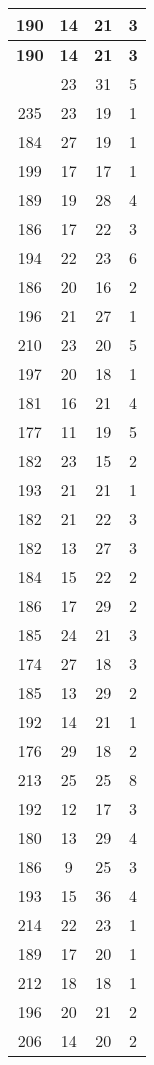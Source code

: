 \documentclass{article}
\begin{document}
\begin{center}
\begin{longtable}{|c|c|c|c|}
\hline
\textbf{190} & \textbf{14} & \textbf{21} & \textbf{3} \\
\hline
\endfirsthead

\hline
\textbf{190} & \textbf{14} & \textbf{21} & \textbf{3} \\
\hline
\endhead

\hline
\endfoot

\hline
\endlastfoot
196 & 23 & 31 & 5 \\
235 & 23 & 19 & 1 \\
184 & 27 & 19 & 1 \\
199 & 17 & 17 & 1 \\
189 & 19 & 28 & 4 \\
186 & 17 & 22 & 3 \\
194 & 22 & 23 & 6 \\
186 & 20 & 16 & 2 \\
196 & 21 & 27 & 1 \\
210 & 23 & 20 & 5 \\
197 & 20 & 18 & 1 \\
181 & 16 & 21 & 4 \\
177 & 11 & 19 & 5 \\
182 & 23 & 15 & 2 \\
193 & 21 & 21 & 1 \\
182 & 21 & 22 & 3 \\
182 & 13 & 27 & 3 \\
184 & 15 & 22 & 2 \\
186 & 17 & 29 & 2 \\
185 & 24 & 21 & 3 \\
174 & 27 & 18 & 3 \\
185 & 13 & 29 & 2 \\
192 & 14 & 21 & 1 \\
176 & 29 & 18 & 2 \\
213 & 25 & 25 & 8 \\
192 & 12 & 17 & 3 \\
180 & 13 & 29 & 4 \\
186 & 9 & 25 & 3 \\
193 & 15 & 36 & 4 \\
214 & 22 & 23 & 1 \\
189 & 17 & 20 & 1 \\
212 & 18 & 18 & 1 \\
196 & 20 & 21 & 2 \\
206 & 14 & 20 & 2 \\

\end{longtable}
\end{center}
\end{document}
